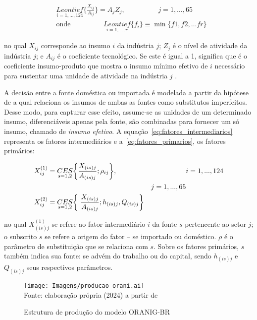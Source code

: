 \begin{align}
	&\underset{i = 1, ... , 124}{Leontief} \biggl\{ \frac{X_{ij}}{A_{ij}} \biggr\} = A_jZ_j, \hspace{2cm} j = 1, \dots , 65 \label{eq:leontief} \\
	&\text{onde} \hspace{2cm} \underset{i = 1, ... , r}{Leontief} \{f_i\} \equiv \min \{ f1, f2, \dots fr \}
\end{align}

\noindent
no qual $X_{ij}$ corresponde ao insumo $i$ da indústria $j$; $Z_j$ é o nível de atividade da indústria $j$; e $A_{ij}$ é o coeficiente tecnológico. Se este é igual a 1, significa que é o coeficiente insumo-produto que mostra o insumo mínimo efetivo de $i$ necessário para sustentar uma unidade de atividade na indústria $j$ \cite{dixit80}.

A decisão entre a fonte doméstica ou importada é modelada a partir da hipótese de \textcite{armington69} a qual relaciona os insumos de ambas as fontes como substitutos imperfeitos. Desse modo, para capturar esse efeito, assume-se as unidades de um determinado insumo, diferenciáveis apenas pela fonte, são combinadas para fornecer um só insumo, chamado de \textit{insumo efetivo}. A equação~\eqref{eq:fatores_intermediarios} representa os fatores intermediários e a~\eqref{eq:fatores_primarios}, os fatores primários:

\begin{align}
	&X_{ij}^{(1)} = \underset{s = 1, 2}{CES} \biggl\{ \frac{X_{(is)j}}{A_{(is)j}}; \rho_{ij} \biggr\}, \label{eq:fatores_intermediarios} &&i = 1, ... , 124 \\ &&j = 1, ... , 65 \notag \\
	&X_{ij}^{(2)} = \underset{s = 1, 2}{CES} \biggl\{ \ \frac{X_{(is)j}}{A_{(is)j}}; h_{(is)j}, Q_{(is)j} \biggr\}&& \label{eq:fatores_primarios}
\end{align}

\noindent
no qual $X_{(is)j}^{(1)}$ se refere ao fator intermediário $i$ da fonte $s$ pertencente ao setor $j$; o subscrito $s$ se refere a origem do fator -- se importado ou doméstico. $\rho$ é o parâmetro de substituição que se relaciona com $s$. Sobre os fatores primários, $s$ também indica sua fonte: se advém do trabalho ou do capital, sendo $h_{(is)j}$ e $Q_{(is)j}$ seus respectivos parâmetros.

\begin{landscape}
	\begin{figure}
		\centering
		\caption{Estrutura de produção do modelo ORANIG-BR} \label{fig:estrutura_producao}
		\texttt{[image: Imagens/producao\_orani.ai]}
		\footnotesize \\
		Fonte: elaboração própria (2024) a partir de \textcite{horridge00}
	\end{figure}
\end{landscape}

